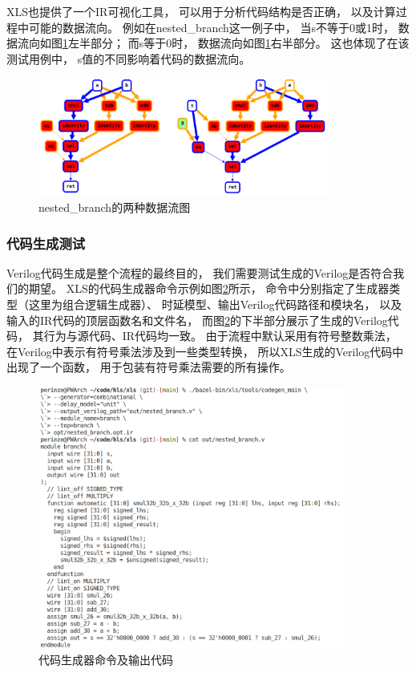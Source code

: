 XLS也提供了一个IR可视化工具，
可以用于分析代码结构是否正确，
以及计算过程中可能的数据流向。
例如在nested\_branch这一例子中，
当s不等于0或1时，
数据流向如图\ref{fig.8}左半部分；
而s等于0时，
数据流向如图\ref{fig.8}右半部分。
这也体现了在该测试用例中，
s值的不同影响着代码的数据流向。

\begin{figure}[h]
\centering
\includegraphics[width=0.85\textwidth]{figure/ir_viz.png}
\caption{nested\_branch的两种数据流图}
\label{fig.8}
\end{figure}

\pagebreak

\subsubsection{代码生成测试}

Verilog代码生成是整个流程的最终目的，
我们需要测试生成的Verilog是否符合我们的期望。
XLS的代码生成器命令示例如图\ref{fig.11}所示，
命令中分别指定了生成器类型（这里为组合逻辑生成器）、
时延模型、输出Verilog代码路径和模块名，
以及输入的IR代码的顶层函数名和文件名，
而图\ref{fig.11}的下半部分展示了生成的Verilog代码，
其行为与源代码、IR代码均一致。
由于流程中默认采用有符号整数乘法，
在Verilog中表示有符号乘法涉及到一些类型转换，
所以XLS生成的Verilog代码中出现了一个函数，
用于包装有符号乘法需要的所有操作。

\begin{figure}[h]
\centering
\includegraphics[width=0.9\textwidth]{figure/codegen_command.png}
\caption{代码生成器命令及输出代码}
\label{fig.11}
\end{figure}

